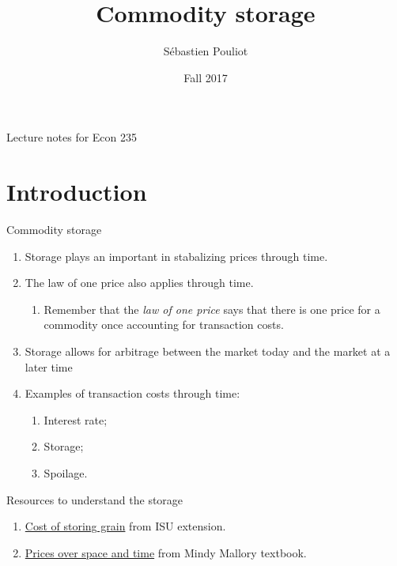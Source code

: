 \documentclass[table,xcolor=pdftex,dvipsnames, handout]{beamer}\usepackage[]{graphicx}\usepackage[]{color}
\title[Commodity storage]{Commodity storage}
\author[Pouliot]{S\'{e}bastien Pouliot}
\institute{Iowa State University}
\date{Fall 2017}
\begin{document}

\begin{frame}
\titlepage
\vspace{-0.4in}
\begin{center}
Lecture notes for Econ 235\\
\end{center}
\end{frame}

\section{Introduction}

\begin{frame}{Commodity storage}
\begin{enumerate}[label=\textbullet]
  \item Storage plays an important in stabalizing prices through time.
  \item The law of one price also applies through time.
      \begin{enumerate}[label=-]
          \item  Remember that the \emph{law of one price} says that there is one price for a commodity once accounting for transaction costs.
       \end{enumerate}  
  \item Storage allows for arbitrage between the market today and the market at a later time
  \item Examples of transaction costs through time:
    \begin{enumerate}[label=-]
      \item Interest rate;
      \item Storage;
      \item Spoilage.
   \end{enumerate}
\end{enumerate}
\end{frame}


\begin{frame}{Resources to understand the storage}
\begin{enumerate}[label=\textbullet]
  \item \href{https://www.extension.iastate.edu/agdm/crops/pdf/a2-33.pdf}{Cost of storing grain} from ISU extension.
  \item \href{http://mindymallory.github.io/PriceAnalysis/prices-over-space-and-time.html}{Prices over space and time} from Mindy Mallory textbook.
\end{enumerate}
\end{frame}
\end{document}
